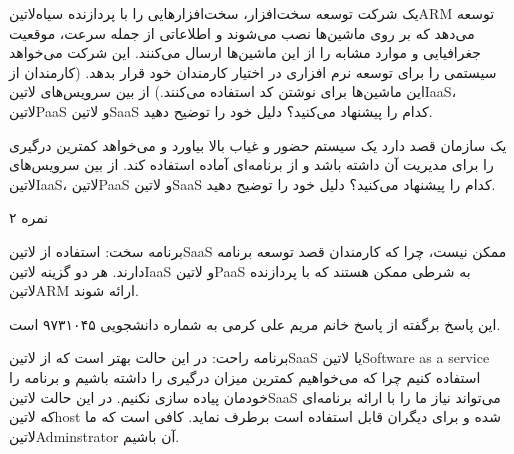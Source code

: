 

یک شرکت توسعه سخت‌افزار، سخت‌افزارهایی را با پردازنده ‌سیاه{‌لاتین{ARM}} توسعه می‌دهد که بر روی ماشین‌ها نصب می‌شوند
و اطلاعاتی از جمله سرعت، موقعیت جغرافیایی و موارد مشابه را از این ماشین‌ها ارسال می‌کنند. این شرکت می‌خواهد سیستمی را برای توسعه نرم افزاری در اختیار کارمندان خود قرار بدهد.
(کارمندان از این ماشین‌ها برای نوشتن کد استفاده می‌کنند.)
از بین سرویس‌های ‌لاتین{IaaS}، ‌لاتین{PaaS} و ‌لاتین{SaaS} کدام را پیشنهاد می‌کنید؟ دلیل خود را توضیح دهید.


یک سازمان قصد دارد یک سیستم حضور و غیاب بالا بیاورد و می‌خواهد کمترین درگیری را برای مدیریت آن داشته باشد و از برنامه‌ای آماده استفاده کند.
از بین سرویس‌های ‌لاتین{IaaS}، ‌لاتین{PaaS} و ‌لاتین{SaaS} کدام را پیشنهاد می‌کنید؟ دلیل خود را توضیح دهید.

۲ نمره

\begin{پاسخ}

برنامه سخت: استفاده از ‌لاتین{SaaS} ممکن نیست، چرا که کارمندان قصد توسعه برنامه دارند.
هر دو گزینه ‌لاتین{IaaS} و ‌لاتین{PaaS} به شرطی ممکن هستند که با پردازنده ‌لاتین{ARM} ارائه شوند.


این پاسخ برگفته از پاسخ خانم مریم علی کرمی به شماره دانشجویی ۹۷۳۱۰۴۵ است.

برنامه راحت: در این حالت بهتر است که از ‌لاتین{SaaS} یا ‌لاتین{Software as a service} استفاده کنیم چرا که می‌خواهیم
کمترین میزان درگیری را داشته باشیم و برنامه را خودمان پیاده سازی نکنیم.
در این حالت ‌لاتین{SaaS} می‌تواند نیاز ما را با ارائه برنامه‌ای که
‌لاتین{host} شده و برای دیگران قابل استفاده است برطرف نماید. کافی است که ما ‌لاتین{Adminstrator} آن
باشیم.

\end{پاسخ}
